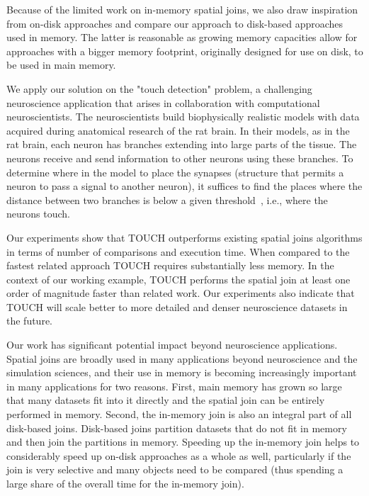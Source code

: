 \documentclass{vldb}
\begin{document}
Because of the limited work on in-memory spatial joins, we also draw inspiration from on-disk approaches and compare our approach to disk-based approaches used
in memory. The latter is reasonable as growing memory capacities allow for approaches with a bigger memory footprint, originally designed for use on disk, to be
used in main memory.

We apply our solution on the "touch detection" problem, a challenging neuroscience application that arises in collaboration with computational
neuroscientists. The neuroscientists build biophysically realistic models with data acquired during anatomical research of the rat brain. In their models, as in
the rat brain, each neuron has branches extending into large parts of the tissue. The neurons receive and send information to other neurons using these
branches. To determine where in the model to place the synapses (structure that permits a neuron to pass a signal to another neuron), it suffices to find the
places where the distance between two branches is below a given threshold~\cite{tabulating}, i.e., where the neurons touch.

Our experiments show that TOUCH outperforms existing spatial joins algorithms in terms of number of comparisons and execution time. When compared to the
fastest related approach TOUCH requires substantially less memory. In the context of our working example, TOUCH performs the spatial join at least one order of
magnitude faster than related work. Our experiments also indicate that TOUCH will scale better to more detailed and denser neuroscience datasets in the future.

Our work has significant potential impact beyond neuroscience applications. Spatial joins are broadly used in many applications beyond neuroscience and the
simulation sciences, and their use in memory is becoming increasingly important in many applications for two reasons. First, main memory has grown so large that
many datasets fit into it directly and the spatial join can be entirely performed in memory. Second, the in-memory join is also an integral part of all
disk-based joins. Disk-based joins partition datasets that do not fit in memory and then join the partitions in memory. Speeding up the in-memory join helps to
considerably speed up on-disk approaches as a whole as well, particularly if the join is very selective and many objects need to be compared (thus spending
a large share of the overall time for the in-memory join).
\end{document}
